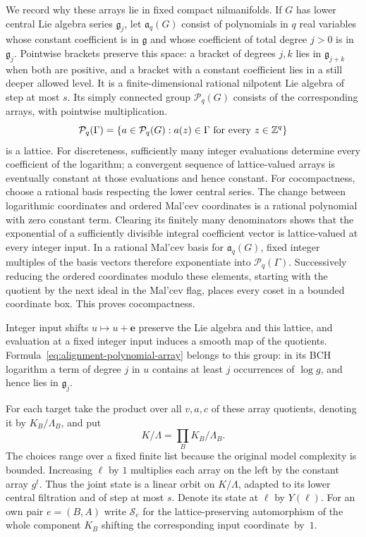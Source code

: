 We record why these arrays lie in fixed compact nilmanifolds.  If
$G$ has lower central Lie algebra series $\mathfrak g_j$, let
$\mathfrak a_q(G)$ consist of polynomials in $q$ real variables
whose constant coefficient is in $\mathfrak g$ and whose coefficient
of total degree $j>0$ is in $\mathfrak g_j$.
Pointwise brackets preserve this space: a bracket of degrees $j,k$
lies in $\mathfrak g_{j+k}$ when both are positive, and a bracket
with a constant coefficient lies in a still deeper allowed level.
It is a finite-dimensional rational nilpotent Lie algebra of step
at most $s$.  Its simply connected group $\mathcal P_q(G)$ consists
of the corresponding arrays, with pointwise multiplication.
\[
 \mathcal P_q(\Gamma)
   =\{a\in\mathcal P_q(G):a(z)\in\Gamma\text{ for every }z\in\mathbb Z^q\}
\]
is a lattice.  For discreteness, sufficiently many integer evaluations
determine every coefficient of the logarithm; a convergent sequence
of lattice-valued arrays is eventually constant at those evaluations
and hence constant.  For cocompactness, choose a rational basis
respecting the lower central series.  The change between logarithmic
coordinates and ordered Mal'cev coordinates is a rational polynomial
with zero constant term.  Clearing its finitely many denominators
shows that the exponential of a sufficiently divisible integral
coefficient vector is lattice-valued at every integer input.
In a rational Mal'cev basis for $\mathfrak a_q(G)$, fixed integer
multiples of the basis vectors therefore exponentiate into
$\mathcal P_q(\Gamma)$.  Successively reducing the ordered
coordinates modulo these elements, starting with the quotient by
the next ideal in the Mal'cev flag, places every coset in a bounded
coordinate box.  This proves cocompactness.

Integer input shifts $u\mapsto u+\mathbf e$ preserve the Lie algebra
and this lattice, and evaluation at a fixed integer input induces
a smooth map of the quotients.  Formula~\eqref{eq:alignment-polynomial-array}
belongs to this group: in its BCH logarithm a term of degree $j$
in $u$ contains at least $j$ occurrences of $\log g$, and hence
lies in $\mathfrak g_j$.

For each target take the product over all $v,a,c$ of these array
quotients, denoting it by $K_B/\Lambda_B$, and put
\[
 K/\Lambda=\prod_B K_B/\Lambda_B.
\]
The choices range over a fixed finite list because the original
model complexity is bounded.  Increasing $\ell$ by $1$ multiplies each
array on the left by the constant array $g^t$.  Thus the joint state
is a linear orbit on $K/\Lambda$, adapted to its lower central
filtration and of step at most $s$.  Denote its state at $\ell$ by
$Y(\ell)$.  For an own pair $e=(B,A)$ write $\mathcal S_e$ for the
lattice-preserving automorphism of the whole component $K_B$
shifting the corresponding input coordinate~by~$1$.

